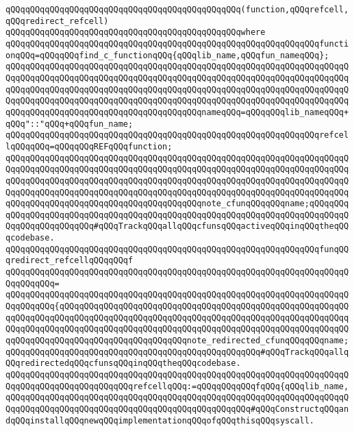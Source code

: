 \verb|qQQqqQQqqQQqqQQqqQQqqQQqqQQqqQQqqQQqqQQqqQQqqQQq(function,qQQqrefcell,qQQqredirect_refcell)|\newline
\verb|qQQqqQQqqQQqqQQqqQQqqQQqqQQqqQQqqQQqqQQqqQQqqQQqwhere|\newline
\verb|qQQqqQQqqQQqqQQqqQQqqQQqqQQqqQQqqQQqqQQqqQQqqQQqqQQqqQQqqQQqqQQqfunctionqQQq=qQQqqQQqfind_c_functionqQQq{qQQqlib_name,qQQqfun_nameqQQq};|\newline
\verb|qQQqqQQqqQQqqQQqqQQqqQQqqQQqqQQqqQQqqQQqqQQqqQQqqQQqqQQqqQQqqQQqqQQqqQQqqQQqqQQqqQQqqQQqqQQqqQQqqQQqqQQqqQQqqQQqqQQqqQQqqQQqqQQqqQQqqQQqqQQqqQQqqQQqqQQqqQQqqQQqqQQqqQQqqQQqqQQqqQQqqQQqqQQqqQQqqQQqqQQqqQQqqQQqqQQqqQQqqQQqqQQqqQQqqQQqqQQqqQQqqQQqqQQqqQQqqQQqqQQqqQQqqQQqqQQqqQQqqQQqqQQqqQQqqQQqqQQqqQQqqQQqqQQqqQQqqQQqqQQqnameqQQq=qQQqqQQqlib_nameqQQq+qQQq"::"qQQq+qQQqfun_name;|\newline
\verb|qQQqqQQqqQQqqQQqqQQqqQQqqQQqqQQqqQQqqQQqqQQqqQQqqQQqqQQqqQQqqQQqrefcellqQQqqQQq=qQQqqQQqREFqQQqfunction;|\newline
\verb|qQQqqQQqqQQqqQQqqQQqqQQqqQQqqQQqqQQqqQQqqQQqqQQqqQQqqQQqqQQqqQQqqQQqqQQqqQQqqQQqqQQqqQQqqQQqqQQqqQQqqQQqqQQqqQQqqQQqqQQqqQQqqQQqqQQqqQQqqQQqqQQqqQQqqQQqqQQqqQQqqQQqqQQqqQQqqQQqqQQqqQQqqQQqqQQqqQQqqQQqqQQqqQQqqQQqqQQqqQQqqQQqqQQqqQQqqQQqqQQqqQQqqQQqqQQqqQQqqQQqqQQqqQQqqQQqqQQqqQQqqQQqqQQqqQQqqQQqqQQqqQQqqQQqqQQqqQQqqQQqnote_cfunqQQqqQQqname;qQQqqQQqqQQqqQQqqQQqqQQqqQQqqQQqqQQqqQQqqQQqqQQqqQQqqQQqqQQqqQQqqQQqqQQqqQQqqQQqqQQqqQQqqQQqqQQq#qQQqTrackqQQqallqQQqcfunsqQQqactiveqQQqinqQQqtheqQQqcodebase.|\newline
\verb|qQQqqQQqqQQqqQQqqQQqqQQqqQQqqQQqqQQqqQQqqQQqqQQqqQQqqQQqqQQqqQQqfunqQQqredirect_refcellqQQqqQQqf|\newline
\verb|qQQqqQQqqQQqqQQqqQQqqQQqqQQqqQQqqQQqqQQqqQQqqQQqqQQqqQQqqQQqqQQqqQQqqQQqqQQqqQQq=|\newline
\verb|qQQqqQQqqQQqqQQqqQQqqQQqqQQqqQQqqQQqqQQqqQQqqQQqqQQqqQQqqQQqqQQqqQQqqQQqqQQqqQQq{qQQqqQQqqQQqqQQqqQQqqQQqqQQqqQQqqQQqqQQqqQQqqQQqqQQqqQQqqQQqqQQqqQQqqQQqqQQqqQQqqQQqqQQqqQQqqQQqqQQqqQQqqQQqqQQqqQQqqQQqqQQqqQQqqQQqqQQqqQQqqQQqqQQqqQQqqQQqqQQqqQQqqQQqqQQqqQQqqQQqqQQqqQQqqQQqqQQqqQQqqQQqqQQqqQQqqQQqqQQqqQQqqQQqqQQqqQQqnote_redirected_cfunqQQqqQQqname;qQQqqQQqqQQqqQQqqQQqqQQqqQQqqQQqqQQqqQQqqQQqqQQqqQQq#qQQqTrackqQQqallqQQqredirectedqQQqcfunsqQQqinqQQqtheqQQqcodebase.|\newline
\newline
\verb|qQQqqQQqqQQqqQQqqQQqqQQqqQQqqQQqqQQqqQQqqQQqqQQqqQQqqQQqqQQqqQQqqQQqqQQqqQQqqQQqqQQqqQQqqQQqqQQqrefcellqQQq:=qQQqqQQqqQQqfqQQq{qQQqlib_name,qQQqqQQqqQQqqQQqqQQqqQQqqQQqqQQqqQQqqQQqqQQqqQQqqQQqqQQqqQQqqQQqqQQqqQQqqQQqqQQqqQQqqQQqqQQqqQQqqQQqqQQqqQQqqQQqqQQqqQQq#qQQqConstructqQQqandqQQqinstallqQQqnewqQQqimplementationqQQqofqQQqthisqQQqsyscall.|\newline
